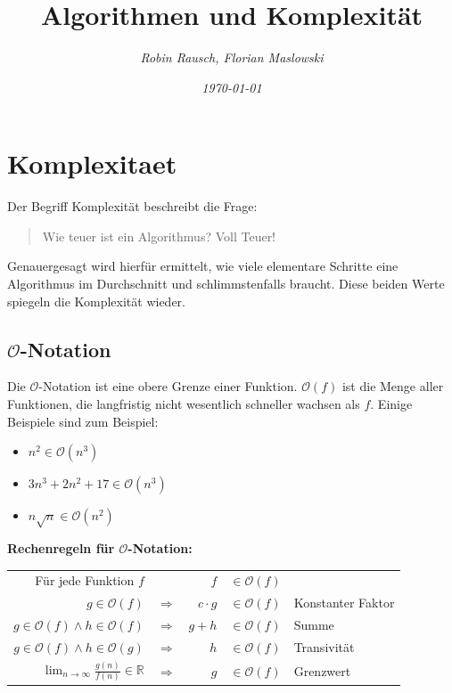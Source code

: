 \documentclass[12pt,a4paper]{article}
\author{\slshape Robin Rausch, Florian Maslowski}
\title{Algorithmen und Komplexität}
\date{\slshape \today}
\begin{document}
\maketitle
\tableofcontents
\newpage
\section{Komplexitaet}
Der Begriff Komplexität beschreibt die Frage:
\begin{quote}
	Wie teuer ist ein Algorithmus? Voll Teuer!
\end{quote}
Genauergesagt wird hierfür ermittelt, wie viele elementare Schritte eine Algorithmus im Durchschnitt und schlimmstenfalls braucht. Diese beiden Werte spiegeln die Komplexität wieder.
\subsection{$\mathcal{O}$-Notation}
Die $\mathcal{O}$-Notation ist eine obere Grenze einer Funktion. $\mathcal{O}(f)$ ist die Menge aller Funktionen, die langfristig nicht wesentlich schneller wachsen als $f$.
\newline
Einige Beispiele sind zum Beispiel:\newline
\begin{itemize}
	\item $n^2 \in \mathcal{O}(n^3)$
	\item $3n^3 + 2n^2 + 17 \in \mathcal{O}(n^3)$
	\item $n \sqrt{n} \in \mathcal{O}(n^2)$
\end{itemize}
\textbf{Rechenregeln für $\mathcal{O}$-Notation:}
\begin{center}
	\begin{tabularx}{\textwidth}{r c r c l}
		Für jede Funktion $f$ & & $f$ & $\in \mathcal{O}(f)$ & \\
		$g \in \mathcal{O}(f)$ & $\Rightarrow $ & $c \cdot g$ & $\in \mathcal{O}(f)$ & Konstanter Faktor\\
		$g \in \mathcal{O}(f) \wedge h \in \mathcal{O}(f)$ & $\Rightarrow $ & $g + h$ & $\in \mathcal{O}(f)$ & Summe\\
		$g \in \mathcal{O}(f) \wedge h \in \mathcal{O}(g)$ & $\Rightarrow $ & $h$ & $\in \mathcal{O}(f)$ & Transivität\\
		$\lim_{n \to \infty} \frac{g(n)}{f(n)} \in \mathbb{R} $ & $\Rightarrow $ & $g$ & $\in \mathcal{O}(f)$ & Grenzwert\\
	\end{tabularx}
\end{center}
\end{document}
